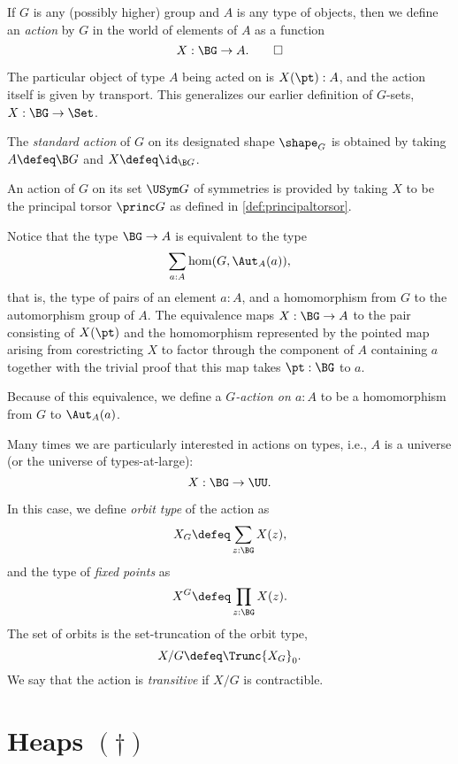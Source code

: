 \begin{definition}\label{action}
  If $G$ is any (possibly higher) group and $A$ is any type of objects,
  then we define an \emph{action} by $G$ in the world of elements of $A$ as a function
  \[
    X : \BG \to A.\qedhere
  \]
\end{definition}

The particular object of type $A$ being acted on is $X(\pt):A$,
and the action itself is given by transport.
This generalizes our earlier definition of $G$-sets, $X : \BG \to \Set$.

\begin{definition}\label{std-action}
  The \emph{standard action} of $G$ on its designated shape $\shape_G$ is obtained by
  taking $A \defeq \B G$ and $X \defeq \id_{\B G}$.
\end{definition}

\begin{example}
  An action of $G$ on its set $\USym G$ of symmetries is provided by taking $X$ to be the principal torsor $\princ G$ as defined in
  \cref{def:principaltorsor}.
\end{example}

Notice that the type $\BG \to A$ is equivalent to the type
\[
  \sum_{a:A}\hom(G,\Aut_A(a)),
\]
that is, the type of pairs of an element $a : A$,
and a homomorphism from $G$ to the automorphism group of $A$.
The equivalence maps $X:\BG\to A$ to the pair consisting of $X(\pt)$
and the homomorphism represented by the pointed map arising
from corestricting $X$ to factor through the component of $A$ containing $a$
together with the trivial proof that this map takes $\pt:\BG$ to $a$.

Because of this equivalence,
we define a \emph{$G$-action on $a:A$}
to be a homomorphism from $G$ to $\Aut_A(a)$.

Many times we are particularly interested in actions on types,
i.e., $A$ is a universe (or the universe of types-at-large):
\[
  X : \BG \to \UU.
\]

In this case, we define \emph{orbit type} of the action as
\[
  X_G \defeq \sum_{z:\BG} X(z),
\]
and the type of \emph{fixed points} as
\[
  X^G \defeq \prod_{z:\BG} X(z).
\]
The set of orbits is the set-truncation of the orbit type,
\[
  X / G \defeq \Trunc{X_G}_0.
\]
We say that the action is \emph{transitive} if $X / G$ is contractible.

\section{Heaps \texorpdfstring{$(\dagger)$}{(\textdagger)}}
\label{sec:heaps}


